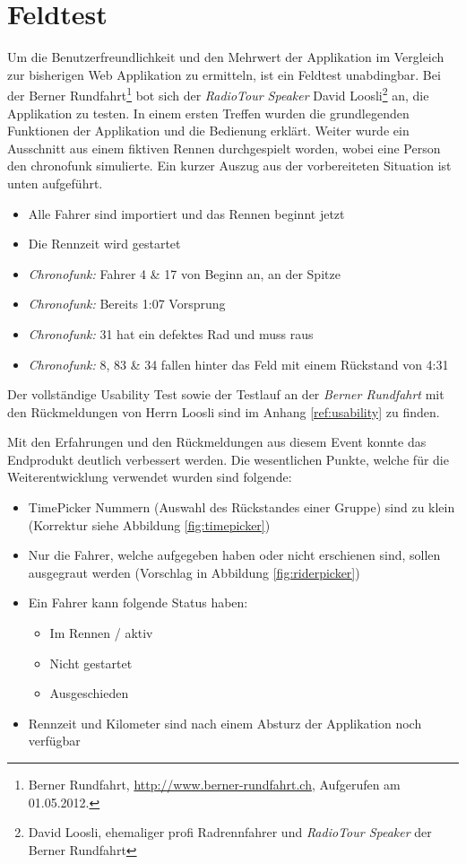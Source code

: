 \section{Feldtest}
Um die Benutzerfreundlichkeit und den Mehrwert der Applikation im Vergleich zur bisherigen Web Applikation zu ermitteln, ist ein Feldtest unabdingbar. Bei der Berner Rundfahrt\footnote{Berner Rundfahrt, \url{http://www.berner-rundfahrt.ch}, Aufgerufen am 01.05.2012.} bot sich der \textit{RadioTour Speaker} David Loosli\footnote{David Loosli, ehemaliger profi Radrennfahrer und \textit{RadioTour Speaker} der Berner Rundfahrt} an, die Applikation zu testen. In einem ersten Treffen wurden die grundlegenden Funktionen der Applikation und die Bedienung erklärt. Weiter wurde ein Ausschnitt aus einem fiktiven Rennen durchgespielt worden, wobei eine Person den \gls{chronofunk} simulierte. Ein kurzer Auszug aus der vorbereiteten Situation ist unten aufgeführt.

\begin{itemize}
\item Alle Fahrer sind importiert und das Rennen beginnt jetzt
\item Die Rennzeit wird gestartet
\item \textit{Chronofunk:} Fahrer 4 \& 17 von Beginn an, an der Spitze
\item \textit{Chronofunk:} Bereits 1:07 Vorsprung
\item \textit{Chronofunk:} 31 hat ein defektes Rad und muss raus
\item \textit{Chronofunk:} 8, 83 \& 34 fallen hinter das Feld mit einem Rückstand von 4:31
\end{itemize}

Der vollständige Usability Test sowie der Testlauf an der \textit{Berner Rundfahrt} mit den Rückmeldungen von Herrn Loosli sind im Anhang \ref{ref:usability} zu finden.

Mit den Erfahrungen und den Rückmeldungen aus diesem Event konnte das Endprodukt deutlich verbessert werden. Die wesentlichen Punkte, welche für die Weiterentwicklung verwendet wurden sind folgende:
\begin{itemize}
\item TimePicker Nummern (Auswahl des Rückstandes einer Gruppe) sind zu klein (Korrektur siehe Abbildung \ref{fig:timepicker})
\item Nur die Fahrer, welche aufgegeben haben oder nicht erschienen sind, sollen ausgegraut werden (Vorschlag in Abbildung \ref{fig:riderpicker})
\item Ein Fahrer kann folgende Status haben:
\begin{itemize}
\item Im Rennen / aktiv
\item Nicht gestartet
\item Ausgeschieden
\end{itemize}
\item Rennzeit und Kilometer sind nach einem Absturz der Applikation noch verfügbar
\end{itemize}

